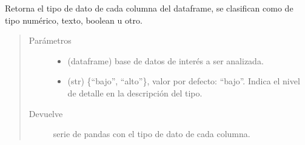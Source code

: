 \documentclass[letterpaper,10pt,openany,spanish]{sphinxmanual}
\begin{document}

\begin{fulllineitems}
\label{\detokenize{datos:datos.col_tipo}}
Retorna el tipo de dato de cada columna del dataframe, se clasifican como de tipo numérico, texto, boolean u otro.
\begin{quote}\begin{description}
\item[{Parámetros}] \leavevmode\begin{itemize}
\item {} 
 \textendash{} (dataframe) base de datos de interés a ser analizada.

\item {} 
 \textendash{} (str) \{“bajo”, “alto”\}, valor por defecto: “bajo”. Indica el nivel de detalle en la descripción del tipo.

\end{itemize}

\item[{Devuelve}] \leavevmode
serie de pandas con el tipo de dato de cada columna.

\end{description}\end{quote}

\end{fulllineitems}

\end{document}
